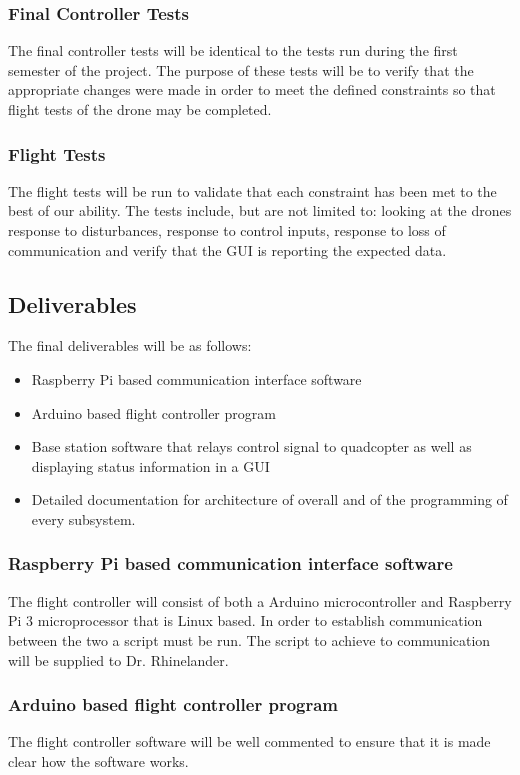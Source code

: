 \subsubsection{Final Controller Tests}
The final controller tests will be identical to the tests run during the first semester of the project. The purpose of these tests will be to verify that the appropriate changes were made in order to meet the defined constraints so that flight tests of the drone may be completed. 

\subsubsection{Flight Tests}
The flight tests will be run to validate that each constraint has been met to the best of our ability. The tests include, but are not limited to: looking at the drones response to disturbances, response to control inputs, response to loss of communication and verify that the GUI is reporting the expected data. 

\subsection{Deliverables}
The final deliverables will be as follows: 
\begin{itemize}
	
\item Raspberry Pi based communication interface software
\item Arduino based flight controller program
\item Base station software that relays control signal to quadcopter as well as displaying status information in a GUI
\item Detailed documentation for architecture of overall and of the programming of every subsystem.

\end{itemize}
\subsubsection{Raspberry Pi based communication interface software}
The flight controller will consist of both a Arduino microcontroller and Raspberry Pi 3 microprocessor that is Linux based. In order to establish communication between the two a script must be run. The script to achieve to communication will be supplied to Dr. Rhinelander. 
\subsubsection{Arduino based flight controller program}
The flight controller software will be well commented to ensure that it is made clear how the software works. 
